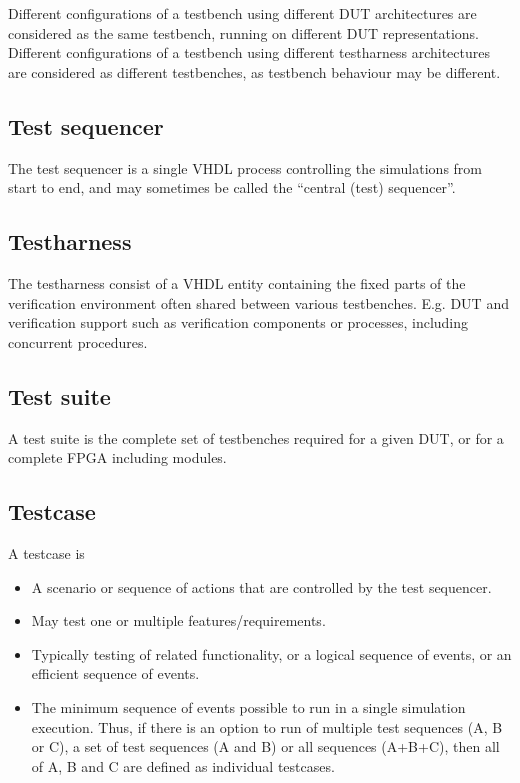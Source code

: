 \documentclass[letterpaper,10pt,english]{sphinxmanual}
\begin{document}
\sphinxAtStartPar
Different configurations of a testbench using different DUT architectures are considered as the same
testbench, running on different DUT representations.
Different configurations of a testbench using different test\sphinxhyphen{}harness architectures are considered as
different testbenches, as testbench behaviour may be different.


\subsection{Test sequencer}
\label{\detokenize{intro:test-sequencer}}
\sphinxAtStartPar
The test sequencer is a single VHDL process controlling the simulations from start to end, and may sometimes
be called the “central (test) sequencer”.


\subsection{Test\sphinxhyphen{}harness}
\label{\detokenize{intro:test-harness}}
\sphinxAtStartPar
The test\sphinxhyphen{}harness consist of a VHDL entity containing the fixed parts of the verification environment \sphinxhyphen{} often shared
between various testbenches. E.g. DUT and verification support such as verification components or processes,
including concurrent procedures.


\subsection{Test suite}
\label{\detokenize{intro:test-suite}}
\sphinxAtStartPar
A test suite is the complete set of testbenches required for a given DUT, or for a complete FPGA including modules.


\subsection{Testcase}
\label{\detokenize{intro:testcase}}
\sphinxAtStartPar
A testcase is
\begin{itemize}
\item {} 
\sphinxAtStartPar
A scenario or sequence of actions that are controlled by the test sequencer.

\item {} 
\sphinxAtStartPar
May test one or multiple features/requirements.

\item {} 
\sphinxAtStartPar
Typically testing of related functionality, or a logical sequence of events, or an efficient sequence
of events.

\item {} 
\sphinxAtStartPar
The minimum sequence of events possible to run in a single simulation execution. Thus, if there is an option to
run of multiple test sequences (A, B or C), a set of test sequences (A and B) or all sequences (A+B+C), then all
of A, B and C are defined as individual testcases.

\end{itemize}
\end{document}
